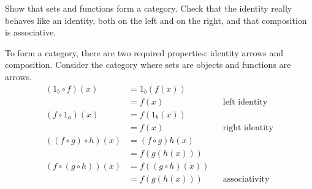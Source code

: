 \begin{ttta}
Show that sets and functions form a category. Check that the identity really
behaves like an identity, both on the left and on the right, and that
composition is associative.
\end{ttta}
To form a category, there are two required properties: identity arrows and
composition. Consider the category where sets are objects and functions are
arrows.
\begin{align*}
    (1_b \circ f)(x)&= 1_b(f(x)) &&\\
               &= f(x) &&\text{left identity}\\
    (f \circ 1_a)(x)&= f(1_b(x)) &&\\
               &= f(x) &&\text{right identity}\\
    \left((f \circ g) \circ h\right)(x) &= (f \circ g)h(x) &&\text{}\\
    &= f(g(h(x))) &&\text{}\\
    \left(f \circ (g \circ h)\right)(x) &= f((g\circ h)(x))\\
    &= f(g(h(x)))&&\text{associativity}
\end{align*}
